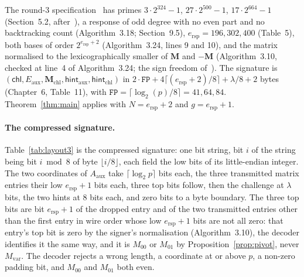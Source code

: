 \documentclass[version=preprint,notanonymous]{iacrcc}
\newcommand{\ers}{e_{\mathrm{rsp}}}
\newcommand{\Mm}{\mathbf{M}}
\newcommand{\Eaux}{E_{\mathrm{aux}}}
\begin{document}
The round-3 specification~\cite{sqisign-spec-r3} has primes $3 \cdot
2^{324} - 1$, $27 \cdot 2^{500} - 1$, $17 \cdot 2^{664} - 1$
(Section~5.2, after~\cite{wes26}), a response of odd degree with no even
part and no backtracking count (Algorithm~3.18; Section~9.5), $\ers =
196, 302, 400$ (Table~5), both bases of order $2^{\ers + 2}$
(Algorithm~3.24, lines 9 and 10), and the matrix normalised to the
lexicographically smaller of $\Mm$ and $-\Mm$ (Algorithm~3.10, checked at
line~4 of Algorithm~3.24; the sign freedom of~\cite{aux-freedom}). The
signature is $(\mathsf{chl}, \Eaux, \Mm_{\mathrm{chl}},
\mathsf{hint}_{\mathrm{aux}}, \mathsf{hint}_{\mathrm{chl}})$ in $2 \cdot
\texttt{FP} + 4 \lceil (\ers + 2)/8 \rceil + \lambda / 8 + 2$ bytes
(Chapter~6, Table~11), with $\texttt{FP} = \lceil \log_2 (p) / 8 \rceil =
41, 64, 84$. Theorem~\ref{thm:main} applies with $N = \ers + 2$ and $g =
\ers + 1$.

\paragraph{The compressed signature.}
Table~\ref{tab:layout3} is the compressed signature: one bit string, bit
$i$ of the string being bit $i \bmod 8$ of byte $\lfloor i / 8 \rfloor$,
each field the low bits of its little-endian integer. The two
coordinates of $A_{\mathrm{aux}}$ take $\lceil \log_2 p \rceil$ bits
each, the three transmitted matrix entries their low $\ers + 1$ bits
each, three top bits follow, then the challenge at $\lambda$ bits, the two
hints at 8 bits each, and zero bits to a byte boundary. The three top
bits are bit $\ers + 1$ of the dropped entry and of the two transmitted
entries other than the first entry in wire order whose low $\ers + 1$
bits are not all zero: that entry's top bit is zero by the signer's
normalisation (Algorithm~3.10), the decoder identifies it the same way,
and it is $M_{00}$ or $M_{01}$ by Proposition~\ref{prop:pivot}, never
$M_{\mathrm{var}}$. The decoder rejects a wrong length, a coordinate at
or above $p$, a non-zero padding bit, and $M_{00}$ and $M_{01}$ both
even.
\end{document}

